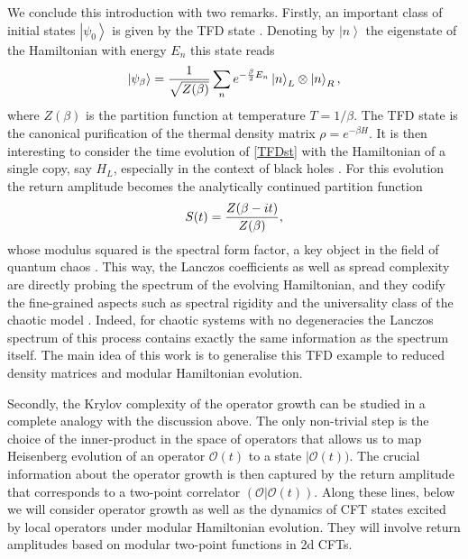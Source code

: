 \documentclass[aps,prl,twocolumn,showpacs,preprintnumbers,amsmath,amssymb]{revtex4-1}
\def\frac#1#2{{#1\over #2}}
\def\be{\begin{equation}}
\def\ee{\end{equation}}
\newcommand{\ket}[1]{\left| #1 \right>}
\begin{document}
We conclude this introduction with two remarks. Firstly, an important class of initial states $\ket{\psi_0}$ is given by the TFD state \cite{Takahashi:1996zn}. Denoting by $\ket{n}$ the eigenstate of the Hamiltonian with energy $E_n$ this state reads
\be
\ket{\psi_\beta}=\frac{1}{\sqrt{Z(\beta)}}\sum_n e^{-\frac{\beta}{2} E_n}\ket{n}_L\otimes\ket{n}_R,\label{TFDst}
\ee
where $Z(\beta)$ is the partition function at temperature $T=1/\beta$. The TFD state is the canonical purification of the thermal density matrix $\rho=e^{-\beta H}$. It is then interesting to consider the time evolution of \eqref{TFDst} with the Hamiltonian of a single copy, say $H_L$, especially in the context of black holes \cite{Hartman:2013qma,Papadodimas:2015xma}. For this evolution the return amplitude becomes the analytically continued partition function
\be
S(t)=\frac{Z(\beta-it)}{Z(\beta)},
\ee
whose modulus squared is the spectral form factor, a key object in the field of quantum chaos \cite{GUHR1998189}. This way, the Lanczos coefficients as well as spread complexity are directly probing the spectrum of the evolving Hamiltonian, and  they codify the fine-grained aspects such as spectral rigidity and the universality class of the chaotic model \cite{Balasubramanian:2022tpr,Balasubramanian:2022dnj,Erdmenger:2023shk}. Indeed, for chaotic systems with no degeneracies the Lanczos spectrum of this process contains exactly the same information as the spectrum itself. The main idea of this work is to generalise this TFD example to reduced density matrices and modular Hamiltonian evolution. 

Secondly, the Krylov complexity of the operator growth \cite{Parker:2018yvk} can be studied in a complete analogy with the discussion above. The only non-trivial step is the choice of the inner-product in the space of operators that allows us to map Heisenberg evolution of an operator $\mathcal{O}(t)$ to a state $|\mathcal{O}(t))$. The crucial information about the operator growth is then captured by the return amplitude that corresponds to a two-point correlator $(\mathcal O|\mathcal{O}(t))$. Along these lines, below we will consider operator growth as well as the dynamics of CFT states excited by local operators under modular Hamiltonian evolution. They will involve return amplitudes based on modular two-point functions in 2d CFTs.  
\end{document}
